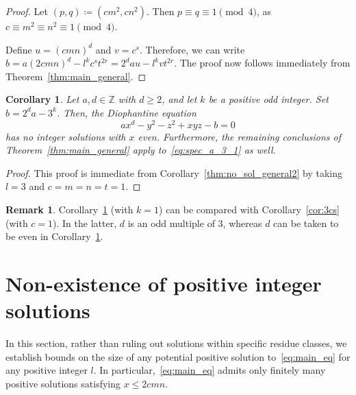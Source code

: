 \documentclass[11pt,a4paper]{amsart}
\newcommand{\ZZ}{\mathbb{Z}}
\theoremstyle{plain}
\newtheorem{corollary}[theorem]{Corollary}
\theoremstyle{definition}
\newtheorem{remark}[theorem]{Remark}
\begin{document}
\begin{proof}
Let $(p,q) \coloneqq (cm^2,cn^2)$. Then $p \equiv q \equiv 1 \pmod 4$, as $c \equiv m^2 \equiv n^2 \equiv 1 \pmod 4$.

Define $u = (c m n)^d$ and $v = c^s$. Therefore, we can write $b = a(2cmn)^{d} - l^{k}c^{s}t^{2r} = 2^{d}au - l^{k}vt^{2r}$.
The proof now follows immediately from Theorem~\ref{thm:main_general}. 
\end{proof}

\begin{corollary}\label{cor:specific_a_3_1}
 Let $a, d \in \ZZ$ with $d \ge 2$, and let $k$ be a positive odd integer. Set $b = 2^{d}a - 3^{k}$. Then, the Diophantine equation
\begin{equation}\label{eq:spec_a_3_1}
  ax^{d} - y^{2} - z^{2} + xyz - b= 0
\end{equation}
has no integer solutions with $x$ even. Furthermore, the remaining conclusions of Theorem~\ref{thm:main_general} apply to~\eqref{eq:spec_a_3_1} as well.
\end{corollary}
\begin{proof}
This proof is immediate from Corollary~\ref{thm:no_sol_general2} by taking $l = 3$ and $c = m = n = t = 1$. 
\end{proof}
\begin{remark}
Corollary~\ref{cor:specific_a_3_1} (with $k=1$) can be compared with Corollary~\ref{cor:3cs} (with $c=1$). In the latter, $d$ is an odd multiple of $3$, whereas $d$ can be taken to be even in Corollary~\ref{cor:specific_a_3_1}. 
\end{remark}

\section{Non-existence of positive integer solutions}\label{sec:positive solution}
In this section, rather than ruling out solutions within specific residue classes, we establish bounds on the size of any potential positive solution to~\eqref{eq:main_eq} for any positive integer $l$. In particular,~\eqref{eq:main_eq} admits only finitely many positive solutions satisfying $x \le 2cmn$.
\end{document}
